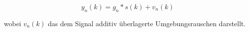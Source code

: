 \begin{equation}
\label{eq:SIMO}
    y_n(k) = g_{n} \ast s(k) + v_n(k)
\end{equation}

wobei $v_n(k)$ das dem Signal additiv überlagerte Umgebungsrauschen darstellt.








